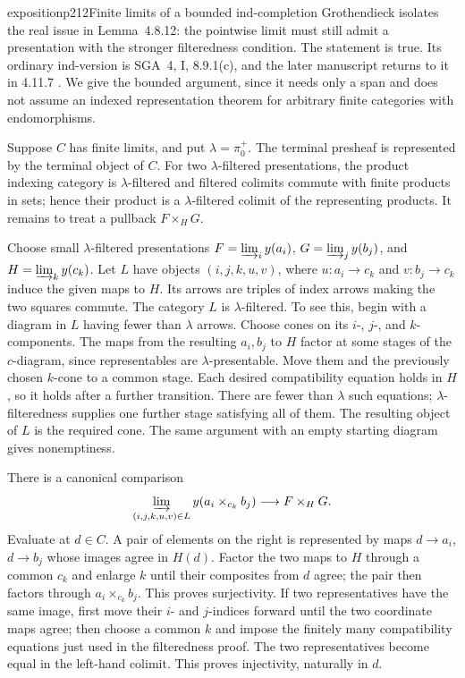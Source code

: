 \begin{dcomment}{exposition}{p212}{Finite limits of a bounded ind-completion}
Grothendieck isolates the real issue in Lemma~4.8.12: the pointwise limit must still admit a presentation with the stronger filteredness condition. The statement is true. Its ordinary ind-version is SGA~4, I, 8.9.1(c), and the later manuscript returns to it in 4.11.7 \citep{SGA4I1972,Grothendieck1990XVIII}. We give the bounded argument, since it needs only a span and does not assume an indexed representation theorem for arbitrary finite categories with endomorphisms.

Suppose $C$ has finite limits, and put $\lambda=\pi_0^+$. The terminal presheaf is represented by the terminal object of $C$. For two $\lambda$-filtered presentations, the product indexing category is $\lambda$-filtered and filtered colimits commute with finite products in sets; hence their product is a $\lambda$-filtered colimit of the representing products. It remains to treat a pullback $F\times_HG$.

Choose small $\lambda$-filtered presentations $F=\varinjlim_i y(a_i)$, $G=\varinjlim_j y(b_j)$, and $H=\varinjlim_k y(c_k)$. Let $L$ have objects $(i,j,k,u,v)$, where $u:a_i\to c_k$ and $v:b_j\to c_k$ induce the given maps to $H$. Its arrows are triples of index arrows making the two squares commute. The category $L$ is $\lambda$-filtered. To see this, begin with a diagram in $L$ having fewer than $\lambda$ arrows. Choose cones on its $i$-, $j$-, and $k$-components. The maps from the resulting $a_i,b_j$ to $H$ factor at some stages of the $c$-diagram, since representables are $\lambda$-presentable. Move them and the previously chosen $k$-cone to a common stage. Each desired compatibility equation holds in $H$, so it holds after a further transition. There are fewer than $\lambda$ such equations; $\lambda$-filteredness supplies one further stage satisfying all of them. The resulting object of $L$ is the required cone. The same argument with an empty starting diagram gives nonemptiness.

There is a canonical comparison
\[
 \varinjlim_{(i,j,k,u,v)\in L}y(a_i\times_{c_k}b_j)
 \longrightarrow F\times_HG.
\]
Evaluate at $d\in C$. A pair of elements on the right is represented by maps $d\to a_i$, $d\to b_j$ whose images agree in $H(d)$. Factor the two maps to $H$ through a common $c_k$ and enlarge $k$ until their composites from $d$ agree; the pair then factors through $a_i\times_{c_k}b_j$. This proves surjectivity. If two representatives have the same image, first move their $i$- and $j$-indices forward until the two coordinate maps agree; then choose a common $k$ and impose the finitely many compatibility equations just used in the filteredness proof. The two representatives become equal in the left-hand colimit. This proves injectivity, naturally in $d$.


\end{dcomment}
